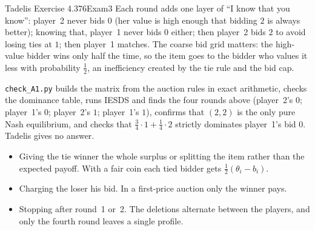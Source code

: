 \begin{exsol}{Tadelis Exercise 4.3}{76}{Exam}{3}
\interp Each round adds one layer of ``I know that you know'': player~2 never bids $0$ (her value
is high enough that bidding $2$ is always better); knowing that, player~1 never bids $0$ either;
then player~2 bids $2$ to avoid losing ties at $1$; then player~1 matches. The coarse bid grid
matters: the high-value bidder wins only half the time, so the item goes to the bidder who values
it less with probability $\tfrac12$, an inefficiency created by the tie rule and the bid cap.

\verify \texttt{check\_A1.py} builds the matrix from the auction rules in exact arithmetic,
checks the dominance table, runs IESDS and finds the four rounds above (player~2's $0$; player~1's
$0$; player~2's $1$; player~1's $1$), confirms that $(2,2)$ is the only pure Nash equilibrium, and
checks that $\tfrac34\cdot1 + \tfrac14\cdot2$ strictly dominates player~1's bid $0$. Tadelis gives
no answer.

\mistakes
\begin{itemize}
  \item Giving the tie winner the whole surplus or splitting the item rather than the expected
  payoff. With a fair coin each tied bidder gets $\tfrac12(\theta_i - b_i)$.
  \item Charging the loser his bid. In a first-price auction only the winner pays.
  \item Stopping after round~1 or~2. The deletions alternate between the players, and only the
  fourth round leaves a single profile.
\end{itemize}

\end{exsol}
